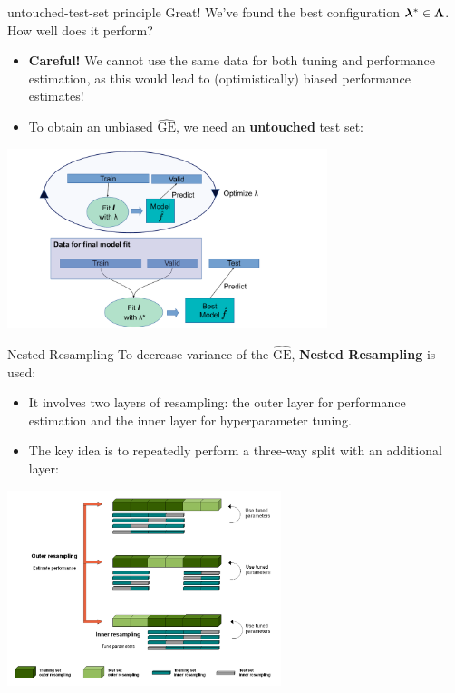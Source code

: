 \documentclass[11pt,compress,t,notes=noshow, xcolor=table]{beamer}
\begin{document}
\begin{vbframe}{untouched-test-set principle}
Great! We've found the best configuration $\bm{\lambda}^{*} \in \bm{\Lambda}$. How well does it perform?
\begin{itemize}
\item \textbf{Careful!} We cannot use the same data for both tuning and performance estimation, as this would lead to (optimistically) biased performance estimates!
\item To obtain an unbiased $\widehat{\mathrm{GE}}$, we need an \textbf{untouched} test set:
\end{itemize}
\begin{center}
\includegraphics[width=0.7\textwidth]{../nested-resampling/figure_man/train_valid_test.pdf}
\end{center}

\end{vbframe}



\begin{vbframe}{Nested Resampling}
To decrease variance of the $\widehat{\mathrm{GE}}$, \textbf{Nested Resampling} is used:

\begin{itemize}
\item \small It involves two layers of resampling: the outer layer for performance estimation and the inner layer for hyperparameter tuning.
\item \small The key idea is to repeatedly perform a three-way split with an additional layer:
\end{itemize}

\begin{center}
\includegraphics[width = 0.6\textwidth]{../nested-resampling/figure_man/Nested_Resampling.png}
\end{center}

\end{vbframe}
\end{document}
